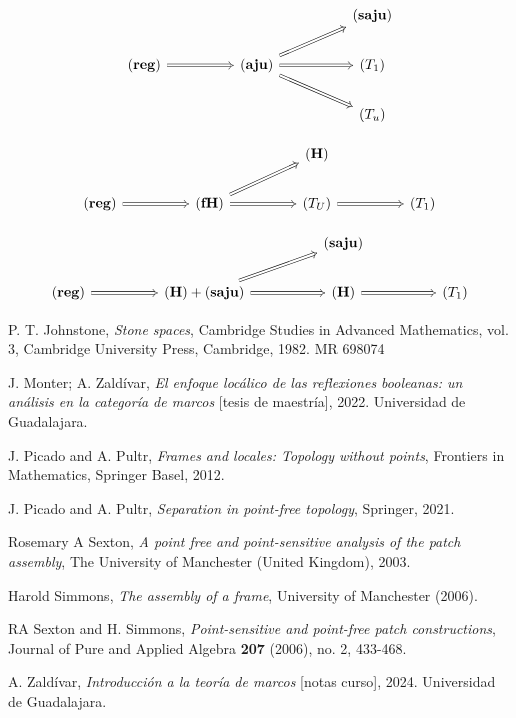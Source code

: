 \documentclass{comunicaciones}
\begin{document}
\[\begin{tikzcd}
	&&&& {\mathbf{(saju)}} \\
	{\mathbf{(reg)}} && {\mathbf{(aju)}} && {(T_1)} \\
	&&&& {(T_u)}
	\arrow[Rightarrow, from=2-1, to=2-3]
	\arrow[Rightarrow, from=2-3, to=1-5]
	\arrow[Rightarrow, from=2-3, to=2-5]
	\arrow[Rightarrow, from=2-3, to=3-5]
\end{tikzcd}\]

\[\begin{tikzcd}
	&&&& {\mathbf{(H)}} \\
	{\mathbf{(reg)}} && {\mathbf{(fH)}} && {(T_U)} && {(T_1)}
	\arrow[Rightarrow, from=2-1, to=2-3]
	\arrow[Rightarrow, from=2-3, to=1-5]
	\arrow[Rightarrow, from=2-3, to=2-5]
	\arrow[Rightarrow, from=2-5, to=2-7]
\end{tikzcd}\]

\[\begin{tikzcd}
	&&&& {\mathbf{(saju)}} \\
	{\mathbf{(reg)}} && {\mathbf{(H)}+\mathbf{(saju)}} && {\mathbf{(H)}} && {(T_1)}
	\arrow[Rightarrow, from=2-1, to=2-3]
	\arrow[Rightarrow, from=2-3, to=1-5]
	\arrow[Rightarrow, from=2-3, to=2-5]
	\arrow[Rightarrow, from=2-5, to=2-7]
\end{tikzcd}\]

\noindent 
\begin{thebibliography}{99}
   P. T. Johnstone, \textit{Stone spaces}, Cambridge Studies in Advanced Mathematics, vol. 3, Cambridge University Press, Cambridge, 1982. MR 698074

   J. Monter; A. Zaldívar, \textit{El enfoque locálico de las reflexiones booleanas: un análisis en la categoría de marcos} [tesis de maestría], 2022. Universidad de Guadalajara.
  
   J. Picado and A. Pultr, \textit{Frames and locales: Topology without points}, Frontiers in Mathematics, Springer Basel, 2012.
  
   J. Picado and A. Pultr, \textit{Separation in point-free topology}, Springer, 2021.
  
   Rosemary A Sexton, \textit{A point free and point-sensitive analysis of the patch assembly}, The University of Manchester (United Kingdom), 2003.
  
   Harold Simmons, \textit{The assembly of a frame}, University of Manchester (2006).
  
   RA Sexton and H. Simmons, \textit{Point-sensitive and point-free patch constructions}, Journal of Pure and Applied Algebra \textbf{207} (2006), no. 2, 433-468.
  
   A. Zaldívar, \textit{Introducción a la teoría de marcos} [notas curso], 2024. Universidad de Guadalajara.
\end{thebibliography}
\end{document}
